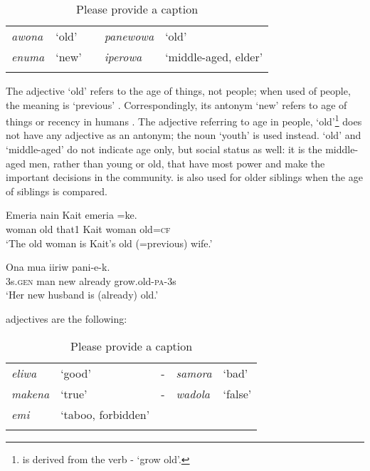 \begin{table}
\caption{Please provide a caption}

\begin{tabular}{>{\itshape}llc>{\itshape}ll}
\mytoprule
awona &`old' && panewowa &`old'\\
enuma &`new' && iperowa &`middle-aged, elder'\\ 
\mybottomrule
\end{tabular}
\end{table}

 The adjective  `old' refers to the age of things, not people; when used of people, the meaning is `previous' . Correspondingly, its antonym  `new' refers to age of things or recency in humans . The adjective referring to age in people,  `old'\footnote{ is derived from the verb - `grow old'.} does not have any adjective as an antonym; the noun  `youth' is used instead.  `old' and  `middle-aged' do not indicate age only, but social status as well: it is the middle-aged men, rather than young or old, that have most power and make the important decisions in the community.  is also used for older siblings when the age of siblings is compared.

\ea%
\label{ex:3:x74}
\gll Emeria  nain Kait emeria =ke. \\
woman old that1 Kait woman old=\textsc{cf}\\
\glt`The old woman is Kait's old (=previous) wife.'
\z

\ea%
\label{ex:3:x75}
\gll Ona mua  iiriw pani-e-k. \\
3s.\textsc{gen} man new already grow.old-\textsc{pa}-3s\\
\glt`Her new husband is (already) old.'
\z

 adjectives are the following: 

\begin{table}
\caption{Please provide a caption}

\begin{tabular}{>{\itshape}llc>{\itshape}ll}
\mytoprule
eliwa &`good' &- &samora &`bad'\\
makena &`true' &- &wadola &`false'\\
emi &`taboo, forbidden'\\
\mybottomrule
\end{tabular}
\end{table}


